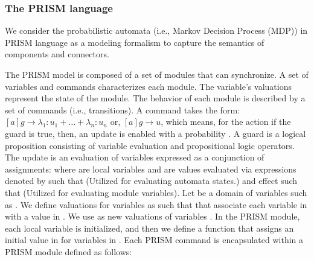 \subsubsection{The PRISM language}
\label{sec:prism:rappel}
We consider the probabilistic automata (i.e., Markov Decision Process (MDP)) in PRISM language \cite{Kwiatkowskaprism2011} as a modeling formalism to capture the semantics of components and connectors. 

The PRISM model is composed of a set of modules that can synchronize. A set of variables and commands characterizes each module. The variable's valuations represent the state of the module. The behavior of each module is described by a set of commands (i.e., transitions). A command takes the form: $ [a] g \rightarrow \lambda_{1}: u_{1} + \ldots+ \lambda_{n}: u_{n} $ or, $[a] g \rightarrow u$, which means, for the action  if the guard  is true, then, an update  is enabled with a probability . A guard is a logical proposition consisting of variable evaluation and propositional logic operators. The update  is an evaluation of variables expressed as a conjunction of assignments:  where  are local variables and  are values evaluated via expressions denoted by  such that  (Utilized for evaluating automata states.) and effect such that (Utilized for evaluating module variables).
Let  be a domain of variables such as . We define valuations for variables  as  such that  that associate each variable in  with a value in . We use  as new valuations of variables . In the PRISM module, each local variable is initialized, and then we define a function  that assigns an initial value in  for variables in . Each PRISM command is encapsulated within a PRISM module defined as follows:

